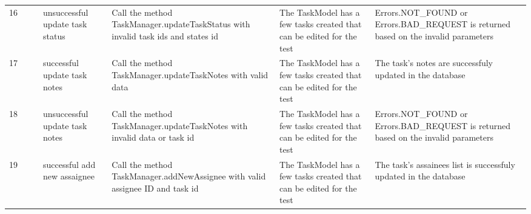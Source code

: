 \documentclass{article}
\begin{document}
{\begin{tabular}{|l|c|l|l|l|l|l|}
    \cellcolor[HTML]{FFFFFF}16                                    & \cellcolor[HTML]{FFFFFF}                                                     & \cellcolor[HTML]{FFFFFF}{\color[HTML]{11734B} Automated}        & unsuccessful update task status                & \cellcolor[HTML]{FFFFFF}Call the method TaskManager.updateTaskStatus with invalid task ids and states id                         & \cellcolor[HTML]{FFFFFF}The TaskModel has a few tasks created that can be edited for the test  & \cellcolor[HTML]{FFFFFF}Errors.NOT\_FOUND or Errors.BAD\_REQUEST is returned based on the invalid parameters                  \\ \cline{1-1} \cline{3-7}
    \cellcolor[HTML]{FFFFFF}17                                    & \cellcolor[HTML]{FFFFFF}                                                     & \cellcolor[HTML]{FFFFFF}{\color[HTML]{11734B} Automated}        & successful update task notes                   & \cellcolor[HTML]{FFFFFF}Call the method TaskManager.updateTaskNotes with valid data                                              & \cellcolor[HTML]{FFFFFF}The TaskModel has a few tasks created that can be edited for the test  & \cellcolor[HTML]{FFFFFF}The task's notes are successfuly updated in the database                                              \\ \cline{1-1} \cline{3-7}
    \cellcolor[HTML]{FFFFFF}18                                    & \cellcolor[HTML]{FFFFFF}                                                     & \cellcolor[HTML]{FFFFFF}{\color[HTML]{11734B} Automated}        & unsuccessful update task notes                 & \cellcolor[HTML]{FFFFFF}Call the method TaskManager.updateTaskNotes with invalid data or task id                                 & \cellcolor[HTML]{FFFFFF}The TaskModel has a few tasks created that can be edited for the test  & \cellcolor[HTML]{FFFFFF}Errors.NOT\_FOUND or Errors.BAD\_REQUEST is returned based on the invalid parameters                  \\ \cline{1-1} \cline{3-7}
    \cellcolor[HTML]{FFFFFF}19                                    & \cellcolor[HTML]{FFFFFF}                                                     & \cellcolor[HTML]{FFFFFF}{\color[HTML]{11734B} Automated}        & successful add new assaignee                   & \cellcolor[HTML]{FFFFFF}Call the method TaskManager.addNewAssignee with valid assignee ID and task id                            & \cellcolor[HTML]{FFFFFF}The TaskModel has a few tasks created that can be edited for the test  & \cellcolor[HTML]{FFFFFF}The task's assainees list is successfuly updated in the database                                      \\ \cline{1-1} \cline{3-7}

\end{tabular}}
\end{document}
